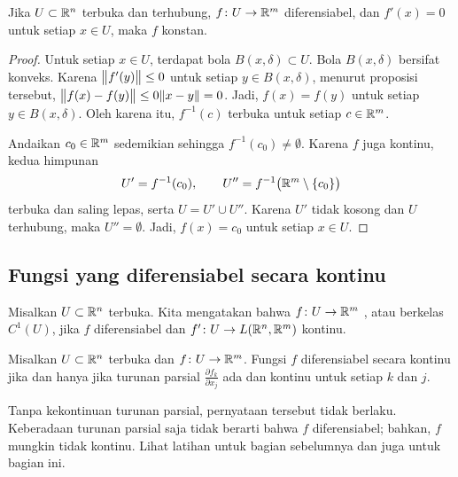 \begin{cor}
Jika $U \subset {\mathbb{R}}^n$ terbuka dan terhubung, $f \colon U \to {\mathbb{R}}^m$
diferensiabel,
dan $f'(x) = 0$ untuk setiap $x \in U$, maka $f$ konstan.
\end{cor}

\begin{proof}
Untuk setiap $x \in U$, terdapat bola $B(x,\delta) \subset U$.  Bola
$B(x,\delta)$ bersifat konveks.  Karena
$\bigl\lVert {f'(y)} \bigr\rVert \leq 0$ untuk setiap $y \in B(x,\delta)$, menurut proposisi tersebut,
$\bigl\lVert {f(x)-f(y)} \bigr\rVert \leq 0 \lVert {x-y} \rVert = 0$.  Jadi, $f(x) = f(y)$ untuk setiap $y \in
B(x,\delta)$.
Oleh karena itu, $f^{-1}(c)$ terbuka untuk setiap $c \in {\mathbb{R}}^m$.

Andaikan $c_0 \in {\mathbb{R}}^m$ sedemikian sehingga
$f^{-1}(c_0) \neq \emptyset$. 
Karena $f$ juga kontinu,
kedua himpunan
\begin{equation*}
U' = f^{-1}(c_0), \qquad U'' = f^{-1}\bigl({\mathbb{R}}^m\setminus\{c_0\}\bigr)
\end{equation*}
terbuka dan saling lepas, serta $U = U' \cup U''$.  Karena $U'$ tidak kosong
dan $U$ terhubung, maka
$U'' = \emptyset$.  Jadi, $f(x) = c_0$ untuk setiap $x \in U$.
\end{proof}

\subsection{Fungsi yang diferensiabel secara kontinu}

\begin{defn}
Misalkan $U \subset {\mathbb{R}}^n$ terbuka.
Kita mengatakan bahwa $f \colon U \to {\mathbb{R}}^m$
\emph{},
atau berkelas $C^1(U)$,
jika $f$ diferensiabel dan $f' \colon U \to L({\mathbb{R}}^n,{\mathbb{R}}^m)$
kontinu.
\end{defn}

\begin{prop} \label{mv:prop:contdiffpartials}
Misalkan $U \subset {\mathbb{R}}^n$ terbuka dan
$f \colon U \to {\mathbb{R}}^m$.  Fungsi
$f$ diferensiabel secara kontinu jika dan hanya jika 
turunan parsial $\frac{\partial f_k}{\partial x_j}$
ada dan kontinu untuk setiap $k$ dan $j$.
\end{prop}

Tanpa kekontinuan turunan parsial, pernyataan tersebut tidak berlaku.  Keberadaan
turunan parsial saja tidak berarti bahwa $f$ diferensiabel;
bahkan, $f$ mungkin tidak kontinu.  Lihat latihan
untuk bagian sebelumnya dan juga untuk bagian ini.

